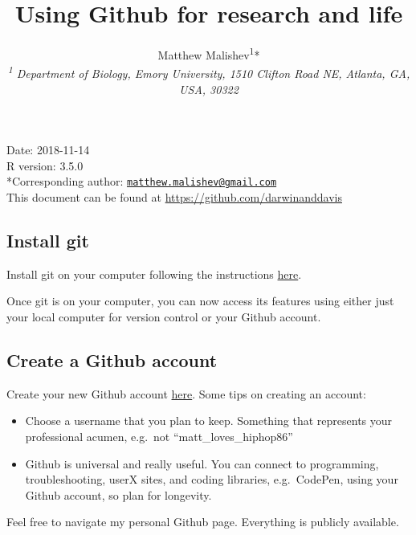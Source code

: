 \documentclass[10,portrait]{article}
\title{Using Github for research and life}
\author{Matthew
Malishev\textsuperscript{1}*\\[2\baselineskip]\emph{\textsuperscript{1}
Department of Biology, Emory University, 1510 Clifton Road NE, Atlanta,
GA, USA, 30322}}
\date{}
\providecommand{\tightlist}{%
  \setlength{\itemsep}{0pt}\setlength{\parskip}{0pt}}
\begin{document}
\maketitle

{
\hypersetup{linkcolor=black}
\setcounter{tocdepth}{4}
\tableofcontents
}
\newpage   

Date: 2018-11-14\\
R version: 3.5.0\\
*Corresponding author:
\href{mailto:matthew.malishev@gmail.com}{\nolinkurl{matthew.malishev@gmail.com}}\\
This document can be found at \url{https://github.com/darwinanddavis}\\
\newpage  

\subsection{Install git}\label{install-git}

Install git on your computer following the instructions
\href{https://git-scm.com/book/en/v2/Getting-Started-Installing-Git}{here}.

Once git is on your computer, you can now access its features using
either just your local computer for version control or your Github
account.

\subsection{Create a Github account}\label{create-a-github-account}

Create your new Github account \href{https://github.com/}{here}. Some
tips on creating an account:

\begin{itemize}
\tightlist
\item
  Choose a username that you plan to keep. Something that represents
  your professional acumen, e.g.~not ``matt\_loves\_hiphop86''\\
  \hspace*{0.333em}
\item
  Github is universal and really useful. You can connect to programming,
  troubleshooting, userX sites, and coding libraries, e.g.~CodePen,
  using your Github account, so plan for longevity.\\
  \hspace*{0.333em}
\end{itemize}

Feel free to navigate my personal Github page. Everything is publicly
available.
\end{document}
